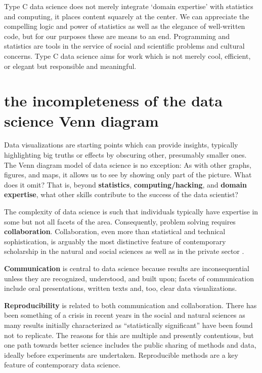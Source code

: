 \documentclass[
  openany]{book}
\begin{document}
Type C data science does not merely integrate `domain expertise' with statistics and computing, it places content squarely at the center. We can appreciate the compelling logic and power of statistics as well as the elegance of well-written code, but for our purposes these are means to an end. Programming and statistics are tools in the service of social and scientific problems and cultural concerns. Type C data science aims for work which is not merely cool, efficient, or elegant but responsible and meaningful.

\hypertarget{the-incompleteness-of-the-data-science-venn-diagram}{%
\section{the incompleteness of the data science Venn diagram}\label{the-incompleteness-of-the-data-science-venn-diagram}}

Data visualizations are starting points which can provide insights, typically highlighting big truths or effects by obscuring other, presumably smaller ones. The Venn diagram model of data science is no exception: As with other graphs, figures, and maps, it allows us to see by showing only part of the picture. What does it omit? That is, beyond \textbf{statistics}, \textbf{computing/hacking}, and \textbf{domain expertise}, what other skills contribute to the success of the data scientist?

The complexity of data science is such that individuals typically have expertise in some but not all facets of the area. Consequently, problem solving requires \textbf{collaboration}. Collaboration, even more than statistical and technical sophistication, is arguably the most distinctive feature of contemporary scholarship in the natural and social sciences as well as in the private sector \citep{isaacson2014}.

\textbf{Communication} is central to data science because results are inconsequential unless they are recognized, understood, and built upon; facets of communication include oral presentations, written texts and, too, clear data visualizations.

\textbf{Reproducibility} is related to both communication and collaboration. There has been something of a crisis in recent years in the social and natural sciences as many results initially characterized as ``statistically significant'' have been found not to replicate. The reasons for this are multiple and presently contentious, but one path towards better science includes the public sharing of methods and data, ideally before experiments are undertaken. Reproducible methods are a key feature of contemporary data science.
\end{document}
